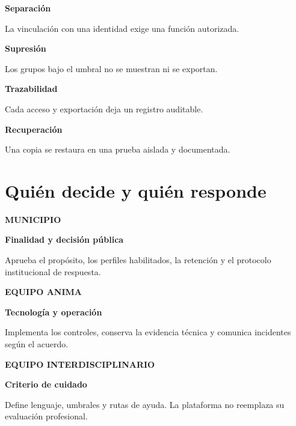\documentclass[11pt,a4paper]{article}
\newcommand{\rolecard}[3]{%
  \begin{minipage}[t]{.315\textwidth}
    \begin{softcard}[height=43mm,top=2.5mm,bottom=2.5mm]
      {\scriptsize\bfseries\color{Terracotta}\MakeUppercase{#1}}\par
      {\small\bfseries\color{Navy}#2}\par\smallskip
      {\small #3}
    \end{softcard}
  \end{minipage}%
}
\begin{document}
\vspace{5mm}
\begin{softcard}[height=39mm,top=3mm,bottom=3mm]
  \begin{minipage}[t]{.23\linewidth}\vspace{0pt}
    {\footnotesize\bfseries\color{Navy}Separación}\par
    {\footnotesize La vinculación con una identidad exige una función autorizada.}
  \end{minipage}\hfill
  \begin{minipage}[t]{.23\linewidth}\vspace{0pt}
    {\footnotesize\bfseries\color{Navy}Supresión}\par
    {\footnotesize Los grupos bajo el umbral no se muestran ni se exportan.}
  \end{minipage}\hfill
  \begin{minipage}[t]{.23\linewidth}\vspace{0pt}
    {\footnotesize\bfseries\color{Navy}Trazabilidad}\par
    {\footnotesize Cada acceso y exportación deja un registro auditable.}
  \end{minipage}\hfill
  \begin{minipage}[t]{.23\linewidth}\vspace{0pt}
    {\footnotesize\bfseries\color{Navy}Recuperación}\par
    {\footnotesize Una copia se restaura en una prueba aislada y documentada.}
  \end{minipage}
\end{softcard}

\clearpage

\section{Quién decide y quién responde}

\rolecard{Municipio}{Finalidad y decisión pública}{Aprueba el propósito, los perfiles habilitados, la retención y el protocolo institucional de respuesta.}%
\hfill
\rolecard{Equipo Anima}{Tecnología y operación}{Implementa los controles, conserva la evidencia técnica y comunica incidentes según el acuerdo.}%
\hfill
\rolecard{Equipo interdisciplinario}{Criterio de cuidado}{Define lenguaje, umbrales y rutas de ayuda. La plataforma no reemplaza su evaluación profesional.}
\end{document}
